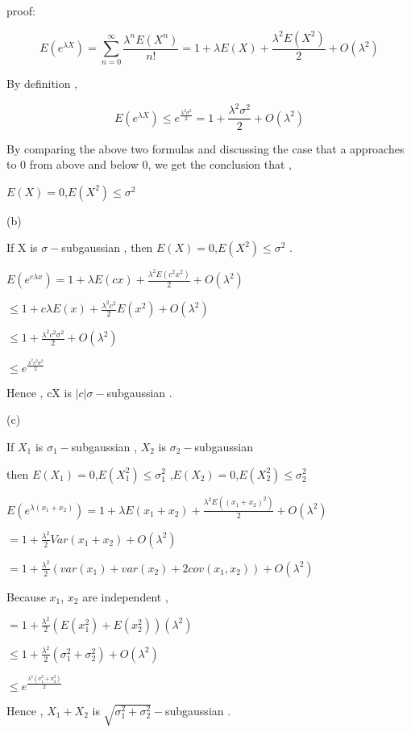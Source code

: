 proof:

\begin{equation}
E(e^{\lambda X}) = \sum_{n=0}^{\infty}\frac{\lambda^n E(X^n)}{n!}=1+\lambda E(X)+\frac{\lambda^2 E(X^2)}{2}+O(\lambda^2)
\end{equation}

By definition ,

\begin{equation}
E(e^{\lambda X})\leq e^{\frac{\lambda^2 \sigma^2}{2}}=1+\frac{\lambda^2 \sigma^2}{2}+O(\lambda^2)
\end{equation}

By comparing the above two formulas and discussing the case that a approaches to 0 from above and below 0, we get the conclusion that ,

$E(X)=0$,$E(X^2)\leq\sigma^2$

(b)

If X is $\sigma-$subgaussian , then $E(X)=0$,$E(X^2)\leq\sigma^2$ .

$E(e^{c\lambda x}) = 1+\lambda E(cx)+\frac{\lambda^2 E(c^2 x^2)}{2}+O(\lambda^2)$

$\leq 1+c\lambda E(x)+\frac{\lambda^2 c^2}{2} E(x^2)+O(\lambda^2)$

$\leq 1+\frac{\lambda^2 c^2 \sigma^2}{2}+O(\lambda^2)$

$\leq e^{\frac{\lambda^2 c^2 \sigma^2}{2}}$

Hence , cX is $|c|\sigma-$subgaussian .

(c)

If $X_1$ is $\sigma_1-$subgaussian , $X_2$ is $\sigma_2-$subgaussian

then $E(X_1)=0$,$E(X_1^2)\leq\sigma_1^2$ ,$E(X_2)=0$,$E(X_2^2)\leq\sigma_2^2$

$E(e^{\lambda (x_1+x_2)}) = 1+\lambda E(x_1+x_2)+\frac{\lambda^2 E((x_1+x_2)^2)}{2}+O(\lambda^2)$

$= 1+\frac{\lambda^2}{2} Var(x_1+x_2)+O(\lambda^2)$

$= 1+\frac{\lambda^2}{2} (var(x_1)+var(x_2)+2cov(x_1,x_2))+O(\lambda^2)$

Because $x_1$, $x_2$ are independent ,

$= 1+\frac{\lambda^2}{2} (E(x_1^2) + E(x_2^2))(\lambda^2)$

$\leq 1+\frac{\lambda^2}{2} (\sigma_1^2 + \sigma_2^2)+O(\lambda^2)$

$\leq e^{\frac{\lambda^2 (\sigma_1^2 + \sigma_2^2)}{2}}$

Hence , $X_1+X_2$ is $\sqrt{\sigma_1^2 + \sigma_2^2}-$subgaussian .




